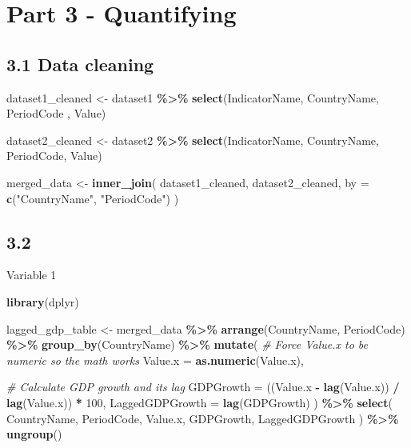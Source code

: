 \documentclass[
]{article}
\newenvironment{Shaded}{\begin{snugshade}}{\end{snugshade}}
\newcommand{\AttributeTok}[1]{\textcolor[rgb]{0.13,0.29,0.53}{#1}}
\newcommand{\CommentTok}[1]{\textcolor[rgb]{0.56,0.35,0.01}{\textit{#1}}}
\newcommand{\DecValTok}[1]{\textcolor[rgb]{0.00,0.00,0.81}{#1}}
\newcommand{\FunctionTok}[1]{\textcolor[rgb]{0.13,0.29,0.53}{\textbf{#1}}}
\newcommand{\NormalTok}[1]{#1}
\newcommand{\OtherTok}[1]{\textcolor[rgb]{0.56,0.35,0.01}{#1}}
\newcommand{\SpecialCharTok}[1]{\textcolor[rgb]{0.81,0.36,0.00}{\textbf{#1}}}
\newcommand{\StringTok}[1]{\textcolor[rgb]{0.31,0.60,0.02}{#1}}
\begin{document}
\section{Part 3 - Quantifying}\label{part-3---quantifying}

\subsection{3.1 Data cleaning}\label{data-cleaning}

\begin{Shaded}
\begin{Highlighting}[]
\NormalTok{dataset1\_cleaned }\OtherTok{\textless{}{-}}\NormalTok{ dataset1 }\SpecialCharTok{\%\textgreater{}\%}
  \FunctionTok{select}\NormalTok{(IndicatorName, CountryName, PeriodCode , Value) }


\NormalTok{dataset2\_cleaned }\OtherTok{\textless{}{-}}\NormalTok{ dataset2 }\SpecialCharTok{\%\textgreater{}\%} 
  \FunctionTok{select}\NormalTok{(IndicatorName, CountryName, PeriodCode, Value)}

\NormalTok{merged\_data }\OtherTok{\textless{}{-}} \FunctionTok{inner\_join}\NormalTok{(}
\NormalTok{  dataset1\_cleaned,}
\NormalTok{  dataset2\_cleaned,}
  \AttributeTok{by =} \FunctionTok{c}\NormalTok{(}\StringTok{"CountryName"}\NormalTok{, }\StringTok{"PeriodCode"}\NormalTok{)}
\NormalTok{)}
\end{Highlighting}
\end{Shaded}

\subsection{3.2}\label{section}

Variable 1

\begin{Shaded}
\begin{Highlighting}[]
\FunctionTok{library}\NormalTok{(dplyr)}

\NormalTok{lagged\_gdp\_table }\OtherTok{\textless{}{-}}\NormalTok{ merged\_data }\SpecialCharTok{\%\textgreater{}\%}
  \FunctionTok{arrange}\NormalTok{(CountryName, PeriodCode) }\SpecialCharTok{\%\textgreater{}\%}
  \FunctionTok{group\_by}\NormalTok{(CountryName) }\SpecialCharTok{\%\textgreater{}\%}
  \FunctionTok{mutate}\NormalTok{(}
    \CommentTok{\# Force Value.x to be numeric so the math works}
    \AttributeTok{Value.x =} \FunctionTok{as.numeric}\NormalTok{(Value.x),}
    
    \CommentTok{\# Calculate GDP growth and its lag}
    \AttributeTok{GDPGrowth =}\NormalTok{ ((Value.x }\SpecialCharTok{{-}} \FunctionTok{lag}\NormalTok{(Value.x)) }\SpecialCharTok{/} \FunctionTok{lag}\NormalTok{(Value.x)) }\SpecialCharTok{*} \DecValTok{100}\NormalTok{,}
    \AttributeTok{LaggedGDPGrowth =} \FunctionTok{lag}\NormalTok{(GDPGrowth)}
\NormalTok{  ) }\SpecialCharTok{\%\textgreater{}\%}
  \FunctionTok{select}\NormalTok{(}
\NormalTok{    CountryName,}
\NormalTok{    PeriodCode,}
\NormalTok{    Value.x,}
\NormalTok{    GDPGrowth,}
\NormalTok{    LaggedGDPGrowth}
\NormalTok{  ) }\SpecialCharTok{\%\textgreater{}\%}
  \FunctionTok{ungroup}\NormalTok{()}
\end{Highlighting}
\end{Shaded}
\end{document}
